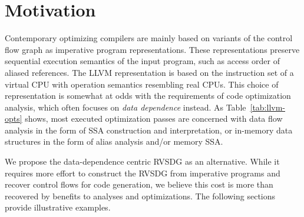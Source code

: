 \section{Motivation}\label{sec:motivation}

Contemporary optimizing compilers are mainly based on variants of the control flow
graph as imperative program representations. %
These representations preserve sequential execution semantics of the input program, such as access order of aliased references.
The LLVM representation is based on the instruction set
of a virtual CPU with operation semantics resembling real CPUs. %
This choice of representation is somewhat at odds with the requirements of code
optimization analysis, which often focuses on {\em data dependence} instead.
As Table~\ref{tab:llvm-opts} shows, most executed optimization passes
are concerned with data flow analysis in the form of SSA construction
and interpretation, or in-memory data structures in the form of alias analysis
and/or memory SSA. %

We propose the data-dependence centric RVSDG as an alternative. %
While it requires more effort to construct the RVSDG from imperative
programs and recover control flows for code generation, we believe this cost
is more than recovered by benefits to analyses and optimizations.
The following sections provide illustrative examples.


